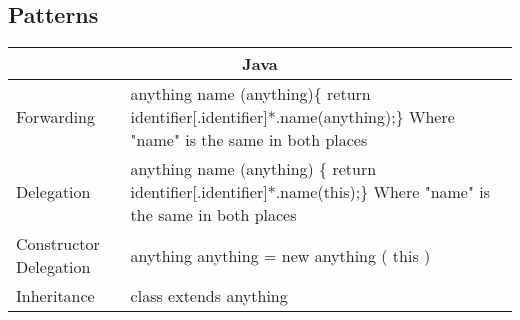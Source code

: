\subsection{Patterns}
\begin{table}[]
	\centering
	\label{javaPatterns}
	\begin{tabular}{|p{5cm}|p{9cm}|}
		\hline
		\multicolumn{2}{|c|}{Java}                                                                                                                                               \\ \hline
		Forwarding                     & anything name (anything)\{ \newline   return identifier{[}.identifier{]}*.name(anything);\newline \} \newline Where "name" is the same in both places \\ \hline
		Delegation                     & anything name (anything) \{ \newline   return identifier{[}.identifier{]}*.name(this);\newline \}  \newline Where "name" is the same in both places                    \\ \hline
		Constructor Delegation & anything anything = new anything ( this )                                                                                                  \\ \hline
		Inheritance                    & class extends anything                                                                                                                                         \\ \hline
	\end{tabular}
\end{table}
